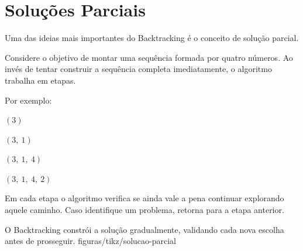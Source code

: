 \section{Soluções Parciais}

Uma das ideias mais importantes do Backtracking é o conceito de solução parcial.

Considere o objetivo de montar uma sequência formada por quatro números. Ao invés de tentar construir a sequência completa imediatamente, o algoritmo trabalha em etapas.

Por exemplo:

\begin{passos}
\begin{description}[leftmargin=4.2em,font=\normalfont\bfseries]
  \item[Etapa 1:] $(3)$
  \item[Etapa 2:] $(3,\ 1)$
  \item[Etapa 3:] $(3,\ 1,\ 4)$
  \item[Etapa 4:] $(3,\ 1,\ 4,\ 2)$
\end{description}
\end{passos}

Em cada etapa o algoritmo verifica se ainda vale a pena continuar explorando aquele caminho. Caso identifique um problema, retorna para a etapa anterior.

%
  {O Backtracking constrói a solução gradualmente, validando cada nova escolha antes de prosseguir.}%
  {figuras/tikz/solucao-parcial}
